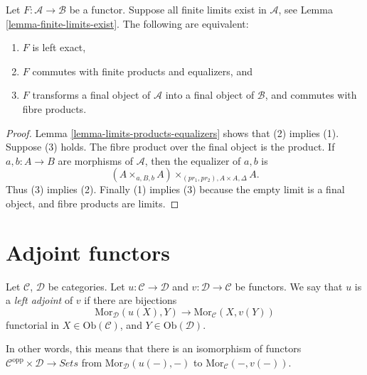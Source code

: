 \begin{lemma}
\label{lemma-characterize-left-exact}
Let $F : \mathcal{A} \to \mathcal{B}$ be a functor.
Suppose all finite limits exist in $\mathcal{A}$,
see Lemma \ref{lemma-finite-limits-exist}.
The following are equivalent:
\begin{enumerate}
\item $F$ is left exact,
\item $F$ commutes with finite products and equalizers, and
\item $F$ transforms a final object of $\mathcal{A}$
into a final object of $\mathcal{B}$, and commutes with fibre products.
\end{enumerate}
\end{lemma}

\begin{proof}
Lemma \ref{lemma-limits-products-equalizers} shows that (2) implies (1). 
Suppose (3) holds. The fibre product over the final object is the product. 
If $a, b : A \to B$ are morphisms of $\mathcal{A}$, then the
equalizer of $a, b$ is
$$
(A \times_{a, B, b} A)\times_{(pr_1, pr_2), A \times A, \Delta} A.
$$
Thus (3) implies (2). Finally (1) implies (3) because
the empty limit is a final object, and fibre products are limits.
\end{proof}


\section{Adjoint functors}
\label{section-adjoint}

\begin{definition}
\label{definition-adjoint}
Let $\mathcal{C}$, $\mathcal{D}$ be categories.
Let $u : \mathcal{C} \to \mathcal{D}$ and
$v : \mathcal{D} \to \mathcal{C}$ be functors.
We say that $u$ is a {\it left adjoint} of $v$
if there are bijections
$$
\text{Mor}_{\mathcal{D}}(u(X), Y)
\longrightarrow
\text{Mor}_{\mathcal{C}}(X, v(Y))
$$
functorial in $X \in \text{Ob}(\mathcal{C})$, and
$Y \in \text{Ob}(\mathcal{D})$.
\end{definition}

\noindent
In other words, this means that there is an isomorphism
of functors $\mathcal{C}^{\text{opp}} \times \mathcal{D}
\to \textit{Sets}$ from $\text{Mor}_{\mathcal{D}}(u(-), -)$
to $\text{Mor}_{\mathcal{C}}(-, v(-))$.

